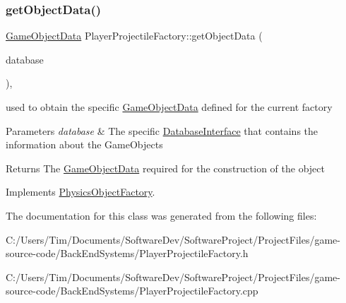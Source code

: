 \subsubsection{\texorpdfstring{get\+Object\+Data()}{getObjectData()}}
{\footnotesize\ttfamily \hyperlink{struct_game_object_data}{Game\+Object\+Data} Player\+Projectile\+Factory\+::get\+Object\+Data (\begin{DoxyParamCaption}\item[{const std\+::shared\+\_\+ptr$<$ \hyperlink{class_database_interface}{Database\+Interface} $>$ \&}]{database }\end{DoxyParamCaption})\hspace{0.3cm}{\ttfamily [override]}, {\ttfamily [virtual]}}



used to obtain the specific \hyperlink{struct_game_object_data}{Game\+Object\+Data} defined for the current factory 


\begin{DoxyParams}{Parameters}
{\em database} & The specific \hyperlink{class_database_interface}{Database\+Interface} that contains the information about the Game\+Objects \\
\hline
\end{DoxyParams}
\begin{DoxyReturn}{Returns}
The \hyperlink{struct_game_object_data}{Game\+Object\+Data} required for the construction of the object 
\end{DoxyReturn}


Implements \hyperlink{class_physics_object_factory_aa59f52d3adc1fac676f4a8a3c2de9ba9}{Physics\+Object\+Factory}.



The documentation for this class was generated from the following files\+:\begin{DoxyCompactItemize}
\item 
C\+:/\+Users/\+Tim/\+Documents/\+Software\+Dev/\+Software\+Project/\+Project\+Files/game-\/source-\/code/\+Back\+End\+Systems/Player\+Projectile\+Factory.\+h\item 
C\+:/\+Users/\+Tim/\+Documents/\+Software\+Dev/\+Software\+Project/\+Project\+Files/game-\/source-\/code/\+Back\+End\+Systems/Player\+Projectile\+Factory.\+cpp\end{DoxyCompactItemize}
